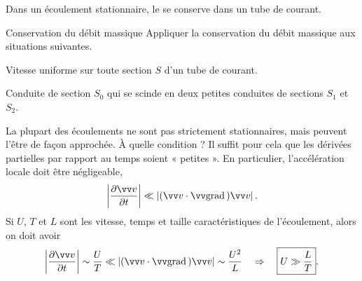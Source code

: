 \documentclass[12pt,fancy]{cours}
\begin{document}
\begin{prop}\label{prop:Dm}
Dans un écoulement stationnaire, le  se conserve dans un tube de courant.
\end{prop}

\begin{exemple}{Conservation du débit massique}
  Appliquer la conservation du débit massique aux situations suivantes.
  \setcounter{quest}{0}
\begin{quest}
  \item Vitesse uniforme sur toute section $S$ d'un tube de courant.
  \item Conduite de section $S_0$ qui se scinde en deux petites conduites de sections $S_1$ et $S_2$.
\end{quest}
\end{exemple}

 La plupart des écoulements ne sont pas strictement stationnaires, mais peuvent l'être de façon approchée. À quelle condition ? Il suffit pour cela que les dérivées partielles par rapport au temps soient « petites ». En particulier, l'accélération locale doit être négligeable,
$$
\norm{\dr{\Vec{v}}{t}} \ll \norm{(\Vec{v}\ps\grad) \Vec{v}}.
$$
Si $U$, $T$ et $L$ sont les vitesse, temps et taille caractéristiques de l'écoulement, alors on doit avoir
$$
\norm{\dr{\Vec{v}}{t}} \sim \frac{U}{T} \ll \norm{(\Vec{v}\ps\grad) \Vec{v}} \sim \frac{U^2}{L} \Rar \boxed{U \gg \frac{L}{T}}.
$$

\end{document}
